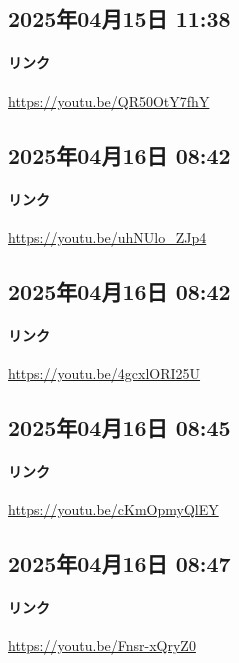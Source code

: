 \subsection*{2025年04月15日 11:38}

\paragraph{リンク}
\url{https://youtu.be/QR50OtY7fhY}

\subsection*{2025年04月16日 08:42}

\paragraph{リンク}
\url{https://youtu.be/uhNUlo_ZJp4}

\subsection*{2025年04月16日 08:42}

\paragraph{リンク}
\url{https://youtu.be/4gcxlORI25U}

\subsection*{2025年04月16日 08:45}

\paragraph{リンク}
\url{https://youtu.be/cKmOpmyQlEY}

\subsection*{2025年04月16日 08:47}

\paragraph{リンク}
\url{https://youtu.be/Fnsr-xQryZ0}

